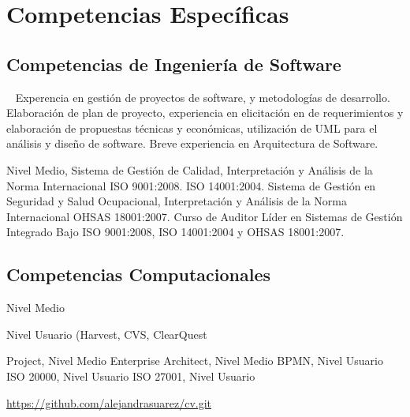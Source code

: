 \documentclass[11pt,letterpaper,roman]{moderncv}
\begin{document}
	
\section{Competencias Espec\'ificas}
\subsection{Competencias de Ingenier\'ia de Software}\
	{Experencia en gestión de proyectos de software, y metodologías de desarrollo. 
	Elaboración de plan de proyecto, experiencia en elicitación en  de requerimientos 
	y elaboración de propuestas técnicas y económicas, utilización de UML para el análisis y diseño 
	de software. Breve experiencia en Arquitectura de Software.}
	

	{Nivel Medio, Sistema de Gestión de Calidad, Interpretación y Análisis de la Norma Internacional ISO 9001:2008. ISO 14001:2004. Sistema de Gestión en Seguridad y Salud Ocupacional, Interpretación y Análisis de la Norma Internacional OHSAS 18001:2007. Curso de Auditor Líder en Sistemas de Gestión Integrado Bajo ISO 9001:2008, ISO 14001:2004 y OHSAS 18001:2007.}

\subsection{Competencias Computacionales}
	{Nivel Medio}

	{Nivel Usuario}
	{(Harvest, CVS, ClearQuest}

Project, Nivel Medio 
Enterprise Architect, Nivel Medio 
BPMN, Nivel Usuario
ISO 20000, Nivel Usuario 
ISO 27001, Nivel Usuario


\url{https://github.com/alejandrasuarez/cv.git}
\end{document}
